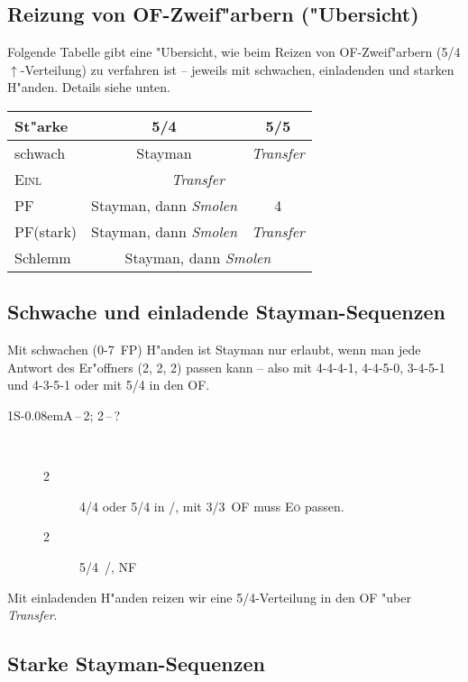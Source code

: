 \documentclass[11pt,german,twocolumn,twoside]{scrartcl}
\def\pi{\Sp\xspace}
\def\co{\He\xspace}
\def\sa{\nobreak\textsf{S\kern-0.08emA}\xspace}
\def\ofa{\nobreak\textsf{OF}\xspace}
\def\pik{\nobreak\hspace{\cardskip}\Sp\xspace}
\def\coe{\nobreak\hspace{\cardskip}\He\xspace}
\def\kar{\nobreak\hspace{\cardskip}\Di\xspace}
\def\tre{\nobreak\hspace{\cardskip}\Cl\xspace}
\def\SA{\nobreak\hspace{\cardskip}\sa}
\def\pl{$\uparrow$\xspace}
\def\sep{\,--\,}
\newcommand{\conv}[1]{\emph{#1}}
\def\pf{\textsc{PF}\xspace}
\def\inv{\textsc{Einl}\xspace}
\def\nf{\textsc{NF}\xspace}
\def\eo{\textsc{E\"o}\xspace}
\def\bdsc{\begin{description}}
\def\edsc{\end{description}}
\begin{document}
\subsection{Reizung von \ofa-Zweif"arbern ("Ubersicht)}

Folgende Tabelle gibt eine "Ubersicht, wie beim Reizen von
\ofa-Zweif"arbern (5/4\pl-Verteilung) zu verfahren ist -- jeweils mit
schwachen, einladenden und starken H"anden.  Details siehe unten.

\begin{center}
\begin{tabular}[t]{|l|c|c|}
\hline
\textbf{St"arke} & \textbf{5/4} & \textbf{5/5}\\
\hline
\hline
schwach & Stayman & \conv{Transfer}\\
\hline
\inv & \multicolumn{2}{c|}{\conv{Transfer}}\\
\hline
\pf & Stayman, dann \conv{Smolen} & 4\kar\\
\hline
\pf (stark) & Stayman, dann \conv{Smolen} & \conv{Transfer}\\
\hline
Schlemm & \multicolumn{2}{c|}{Stayman, dann \conv{Smolen}}\\
\hline
\end{tabular}
\end{center}

\subsection{Schwache und einladende Stayman-Sequenzen}

Mit schwachen (0-7~FP) H"anden ist Stayman nur erlaubt, wenn
man jede Antwort des Er"offners (2\kar, 2\coe, 2\pik) passen kann -- also
mit 4-4-4-1, 4-4-5-0, 3-4-5-1 und 4-3-5-1 oder mit 5/4 in den \ofa.

\bdsc
\item[1\SA{}\sep2\tre; 2\kar{}\sep?]~
\bdsc
\item[2\coe] 4/4 oder 5/4 in \coe/\pi, mit 3/3~\ofa muss \eo passen.
\item[2\pik] 5/4~\pik/\co, \nf
\edsc
\edsc

Mit einladenden H"anden reizen wir eine 5/4-Verteilung in den \ofa
"uber \conv{Transfer}.

\subsection{Starke Stayman-Sequenzen}
\end{document}
